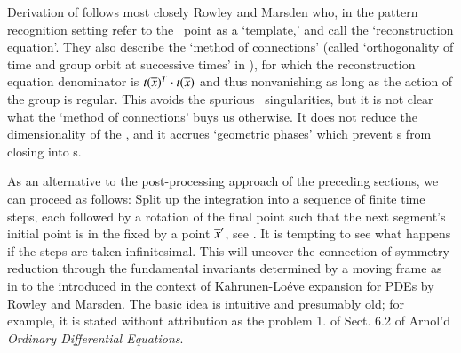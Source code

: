 {Derivation of  follows most closely
Rowley and Marsden who, in the
pattern recognition setting refer to the \slice\ point as a
`template,' and call  the `reconstruction
equation'. They also describe the `method
of connections' (called `orthogonality of time and group
orbit at successive times' in ), for which the
reconstruction equation  denominator is
$t(\overline{x})^T \cdot t(\overline{x})$ and thus
nonvanishing as long as the action of the group is regular.
This avoids the spurious \slice\ singularities, but it is not
clear what the `method of connections' buys us otherwise. It
does not reduce the dimensionality of the \statesp, and it
accrues `geometric phases' which prevent \rpo s from closing
into \po s.

    } %

As an alternative to the post-processing approach of the
preceding sections, we can proceed as follows: Split up the
integration into a sequence of finite time steps, each
followed by a rotation of the final point
such that the next
segment's initial point is in the {\em \slice} fixed by a
point ${\overline{x}'} $, see .
It is tempting to
see what happens if the steps are taken infinitesimal. This will 
uncover the connection of symmetry reduction through the
fundamental invariants determined  by a moving frame as in 
to the \emph{\mslices} introduced in the context of Kahrunen-Lo\'eve
expansion for PDEs by Rowley and Marsden.
The basic idea is intuitive and presumably old; for example, it is stated
without attribution as the problem 1. of Sect. 6.2 of Arnol'd
{\em Ordinary Differential Equations}.

